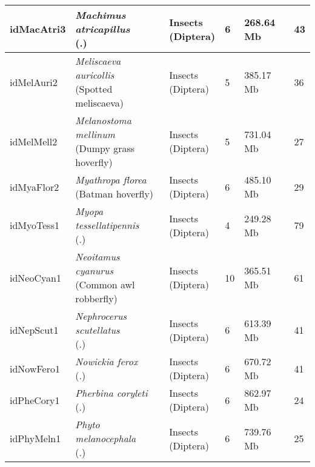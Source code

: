 \begin{centering}
\begin{longtable}{l|l|l|l|l|l}
idMacAtri3 & \makecell[{l}]{\textit{Machimus atricapillus} \\ (.)} & \makecell[{l}]{Insects \\ (Diptera)} & 6 & 268.64 Mb & 43  \\ \hline
idMelAuri2 & \makecell[{l}]{\textit{Meliscaeva auricollis} \\ (Spotted meliscaeva)} & \makecell[{l}]{Insects \\ (Diptera)} & 5 & 385.17 Mb & 36  \\ \hline
idMelMell2 & \makecell[{l}]{\textit{Melanostoma mellinum} \\ (Dumpy grass hoverfly)} & \makecell[{l}]{Insects \\ (Diptera)} & 5 & 731.04 Mb & 27  \\ \hline
idMyaFlor2 & \makecell[{l}]{\textit{Myathropa florea} \\ (Batman hoverfly)} & \makecell[{l}]{Insects \\ (Diptera)} & 6 & 485.10 Mb & 29  \\ \hline
idMyoTess1 & \makecell[{l}]{\textit{Myopa tessellatipennis} \\ (.)} & \makecell[{l}]{Insects \\ (Diptera)} & 4 & 249.28 Mb & 79  \\ \hline
idNeoCyan1 & \makecell[{l}]{\textit{Neoitamus cyanurus} \\ (Common awl robberfly)} & \makecell[{l}]{Insects \\ (Diptera)} & 10 & 365.51 Mb & 61  \\ \hline
idNepScut1 & \makecell[{l}]{\textit{Nephrocerus scutellatus} \\ (.)} & \makecell[{l}]{Insects \\ (Diptera)} & 6 & 613.39 Mb & 41  \\ \hline
idNowFero1 & \makecell[{l}]{\textit{Nowickia ferox} \\ (.)} & \makecell[{l}]{Insects \\ (Diptera)} & 6 & 670.72 Mb & 41  \\ \hline
idPheCory1 & \makecell[{l}]{\textit{Pherbina coryleti} \\ (.)} & \makecell[{l}]{Insects \\ (Diptera)} & 6 & 862.97 Mb & 24  \\ \hline
idPhyMeln1 & \makecell[{l}]{\textit{Phyto melanocephala} \\ (.)} & \makecell[{l}]{Insects \\ (Diptera)} & 6 & 739.76 Mb & 25  \\ \hline

\end{longtable}
\end{centering}
